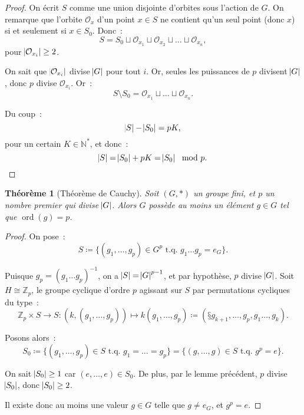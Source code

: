 \documentclass{article}
\newtheorem{thm}{Théorème}[section]
\theoremstyle{definition}
\theoremstyle{remark}
\DeclareMathOperator{\ord}{ord}
\newcommand{\Z}{\mathbb Z}
\newcommand{\N}{\mathbb N}
\newcommand{\tq}{\text{ t.q. }}
\newcommand{\simeqq}{\cong}
\begin{document}
	\begin{proof} On écrit $S$ comme une union disjointe d'orbites sous l'action de $G$. On remarque que l'orbite $\mathcal O_x$ d'un point $x \in S$ ne
	contient qu'un seul point (donc $x$) si et seulement si $x \in S_0$. Donc~:
	\[S = S_0 \sqcup \mathcal O_{x_1} \sqcup \mathcal O_{x_2} \sqcup \ldots \sqcup \mathcal O_{x_n},\]
	pour $\abs {\mathcal O_{x_i}} \geq 2$.

	On sait que $\abs {\mathcal O_{x_i}}$ divise $\abs G$ pour tout $i$. Or, seules les puissances de $p$ divisent $\abs G$, donc $p$ divise $\mathcal O_{x_i}$.
	Or~:
	\[S \setminus S_0 = \mathcal O_{x_1} \sqcup \ldots \sqcup \mathcal O_{x_n}.\]

	Du coup~:
	\[\abs S - \abs {S_0} = pK,\]
	pour un certain $K \in \N^*$, et donc~:
	\[\abs S = \abs {S_0} + pK = \abs {S_0} \mod p.\]
	\end{proof}

	\begin{thm}[Théorème de Cauchy] Soit $(G, *)$ un groupe fini, et $p$ un nombre premier qui divise $\abs G$. Alors $G$ possède au moins un élément $g \in G$
	tel que $\ord(g) = p$.
	\end{thm}

	\begin{proof} On pose~:
	\[S \coloneqq \{(g_1, \ldots, g_p) \in G^p \tq g_1\ldots g_p = e_G\}.\]

	Puisque $g_p = (g_1\ldots g_p)^{-1}$, on a $\abs S = \abs G^{p-1}$, et par hypothèse, $p$ divise $\abs G$. Soit $H \simeqq \Z_p$, le groupe cyclique d'ordre
	$p$ agissant sur $S$ par permutations cycliques du type~:
	\[\Z_p \times S \to S : \left(k, (g_1, \ldots, g_p)\right) \mapsto k(g_1, \ldots, g_p) \coloneq \left(§g_{k+1}, \ldots, g_p, g_1\ldots, g_k\right).\]

	Posons alors~:
	\[S_0 \coloneqq \{(g_1, \ldots, g_p) \in S \tq g_1 = \ldots = g_p\} = \{(g, \ldots, g) \in S \tq g^p = e\}.\]

	On sait $\abs {S_0} \geq 1$ car $(e, \ldots, e) \in S_0$. De plus, par le lemme précédent, $p$ divise $\abs {S_0}$, donc $\abs {S_0} \geq 2$.

	Il existe donc au moins une valeur $g \in G$ telle que $g \neq e_G$, et $g^p = e$.
	\end{proof}
\end{document}
